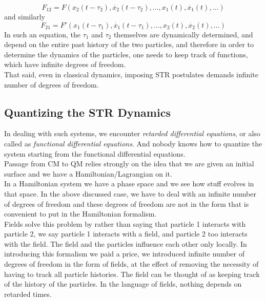 \documentclass[11pt]{article}
\numberwithin{equation}{section}
\begin{document}
    
    
    \begin{equation}
        F_{12} = F(x_2(t-\tau_2), \dot{x_2}(t-\tau_2), \dots, x_1(t), \dot{x_1}(t), \dots)
    \end{equation}
    and similarly
    \begin{equation}
        F_{21} = F'(x_1(t-\tau_1), \dot{x_1}(t-\tau_1), \dots, x_2(t), \dot{x_2}(t), \dots)
    \end{equation}
    In such an equation, the \(\tau_1\) and \(\tau_2\) themselves are dynamically determined, and depend on the entire past history of the two particles, and therefore in order to determine the dynamics of the particles, one needs to keep track of functions, which have infinite degrees of freedom. \\

    That said, even in classical dynamics, imposing STR postulates demands infinite number of degrees of freedom. 

    \subsection{Quantizing the STR Dynamics}
    In dealing with such systems, we encounter \textit{retarded differential equations}, or also called as \textit{functional differential equations}. And nobody knows how to quantize the system starting from the functional differential equations.\\

    Passage from CM to QM relies strongly on the idea that we are given an initial surface and we have a Hamiltonian/Lagrangian on it.\\
    In a Hamiltonian system we have a phase space and we see how stuff evolves in that space. In the above discussed case, we have to deal with an infinite number of degrees of freedom and these degrees of freedom are not in the form that is convenient to put in the Hamiltonian formalism.\\

    Fields solve this problem by rather than saying that particle 1 interacts with particle 2, we say particle 1 interacts with a field, and particle 2 too interacts with the field. The field and the particles influence each other only locally. In introducing this formalism we paid a price, we introduced infinite number of degrees of freedom in the form of fields, at the effect of removing the necessity of having to track all particle histories. The field can be thought of as keeping track of the history of the particles. In the language of fields, nothing depends on retarded times. \\
\end{document}

